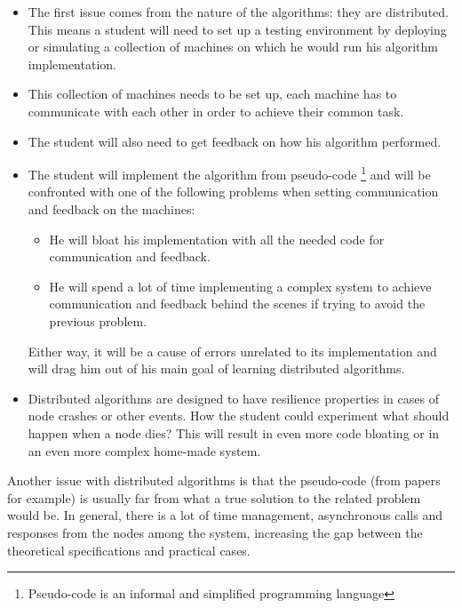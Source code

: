 \documentclass{eplmastersthesis}
\begin{document}
      \begin{itemize}
        \item The first issue comes from the nature of the algorithms: they are
        distributed. This means a student will need to set up a testing
        environment by deploying or simulating a collection of machines on
        which he would run his algorithm implementation.
        \item This collection of machines needs to be set up, each machine has
        to communicate with each other in order to achieve their common task.
        \item The student will also need to get feedback on how his
        algorithm performed.
        \item The student will implement the algorithm from pseudo-code
        \footnote{Pseudo-code is an informal and simplified programming language}
        and will be confronted with one of the following problems when setting
        communication and feedback on the machines:
          \begin{itemize}
            \item He will bloat his implementation with all the needed
            code for communication and feedback.
            \item He will spend a lot of time implementing a complex
            system to achieve communication and feedback behind the scenes if
            trying to avoid the previous problem.
          \end{itemize}
        Either way, it will be a cause of errors unrelated to its
        implementation and will drag him out of his main goal of learning
        distributed algorithms.
        \item Distributed algorithms are designed to have resilience
        properties in cases of node crashes or other events. How the student
        could experiment what should happen when a node dies? This will result
        in even more code bloating or in an even more complex home-made system.
      \end{itemize}

      Another issue with distributed algorithms is that the pseudo-code
      (from papers for example) is usually far from what a true solution to the
      related problem would be. In general, there is a lot of time management,
      asynchronous calls and responses from the nodes among the system,
      increasing the gap between the theoretical specifications and practical
      cases.
\end{document}

